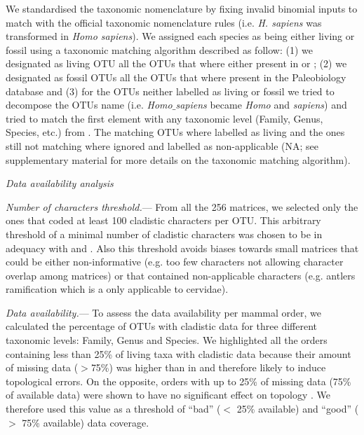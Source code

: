 \documentclass[12pt,letterpaper]{article}
\renewcommand{\subsection}[1]{%
\bigskip
\begin{center}
\begin{large}
\normalfont\itshape #1
\end{large}
\end{center}}
\renewcommand{\subsubsection}[1]{%
\vspace{2ex}
\noindent
\textit{#1.}---}
\begin{document}
We standardised the taxonomic nomenclature by fixing invalid binomial inputs to match with the official taxonomic nomenclature rules (i.e. \textit{H. sapiens} was transformed in \textit{Homo sapiens}).
We assigned each species as being either living or fossil using a taxonomic matching algorithm described as follow: (1) we designated as living OTU all the OTUs that where either present in \citep{FritzTree} or \citep{wilson2005mammal}; (2) we designated as fossil OTUs all the OTUs that where present in the Paleobiology database and (3) for the OTUs neither labelled as living or fossil we tried to decompose the OTUs name (i.e. \textit{Homo$\_$sapiens} became \textit{Homo} and \textit{sapiens}) and tried to match the first element with any taxonomic level (Family, Genus, Species, etc.) from \citep{wilson2005mammal}. %
The matching OTUs where labelled as living and the ones still not matching where ignored and labelled as non-applicable (NA; see supplementary material for more details on the taxonomic matching algorithm).

\subsection{Data availability analysis}
\subsubsection{Number of characters threshold}
From all the 256 %
matrices, we selected only the ones that coded at least 100 cladistic characters per OTU.
This arbitrary threshold of a minimal number of cladistic characters was chosen to be in adequacy with \citep{GuillermeCooper} and \citep{harrisonamong-character2014}.
Also this threshold avoids biases towards small matrices that could be either non-informative \citep{wagner2000} (e.g. too few characters not allowing character overlap among matrices) or that contained non-applicable characters \citep{Brazeau2011} (e.g. antlers ramification which is a only applicable to cervidae).

\subsubsection{Data availability}
To assess the data availability per mammal order, we calculated the percentage of OTUs with cladistic data for three different taxonomic levels: Family, Genus and Species.
We highlighted all the orders containing less than 25\% of living taxa with cladistic data because their amount of missing data ($>$75\%) was higher than in \citep{GuillermeCooper} and therefore likely to induce topological errors.
On the opposite, orders with up to 25\% of missing data (75\% of available data) were shown to have no significant effect on topology \citep{GuillermeCooper}.
We therefore used this value as a threshold of ``bad'' ($<$ 25\% available) and ``good'' ($>$ 75\% available) data coverage.
\end{document}
